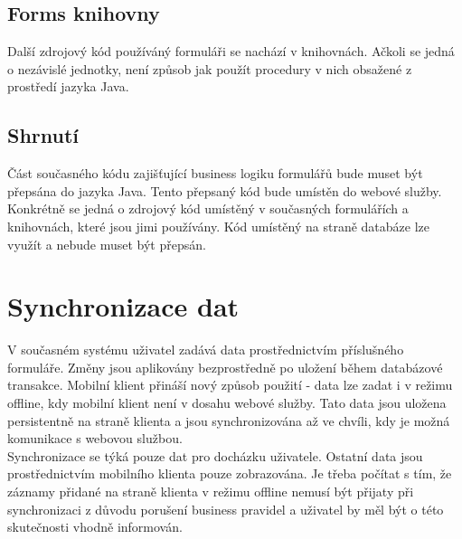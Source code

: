 \documentclass{diplomka}
\begin{document}
\subsection{Forms knihovny}
Další zdrojový kód používáný formuláři se nachází v knihovnách. Ačkoli se jedná o nezávislé jednotky, není způsob jak použít procedury v nich obsažené z prostředí jazyka Java.

\subsection{Shrnutí}
Část současného kódu zajišťující business logiku formulářů bude muset být přepsána do jazyka Java. Tento přepsaný kód bude umístěn do webové služby. Konkrétně se jedná o zdrojový kód umístěný v současných formulářích a knihovnách, které jsou jimi používány. Kód umístěný na straně databáze lze využít a nebude muset být přepsán.

\newpage
\section{Synchronizace dat}
V současném systému uživatel zadává data prostřednictvím příslušného formuláře. Změny jsou aplikovány bezprostředně po uložení během databázové transakce. Mobilní klient přináší nový způsob použití - data lze zadat i v režimu offline, kdy mobilní klient není v dosahu webové služby. Tato data jsou uložena persistentně na straně klienta a jsou synchronizována až ve chvíli, kdy je možná komunikace s webovou službou.\\ \indent
Synchronizace se týká pouze dat pro docházku uživatele. Ostatní data jsou prostřednictvím mobilního klienta pouze zobrazována. Je třeba počítat s tím, že záznamy přidané na straně klienta v režimu offline nemusí být přijaty při synchronizaci z důvodu porušení business pravidel a uživatel by měl být o této skutečnosti vhodně informován.
\end{document}
